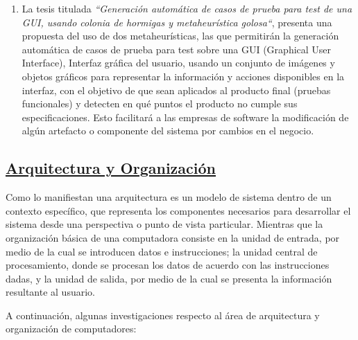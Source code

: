 \documentclass[10pt,conference]{IEEEtran}
\begin{document}
\begin{enumerate}
\item La tesis titulada \textit{“Generación automática de casos de prueba para test de una GUI, usando colonia de hormigas y metaheurística golosa“}, presenta una propuesta del uso de dos metaheurísticas, las que permitirán la generación automática de casos de prueba para test sobre una GUI (Graphical User Interface), Interfaz gráfica del usuario, usando un conjunto de imágenes y objetos gráficos para representar la información y acciones disponibles en la interfaz, con el objetivo de que sean aplicados al producto final (pruebas funcionales) y detecten en qué puntos el producto no cumple sus especificaciones. Esto facilitará a las empresas de software la modificación de algún artefacto o componente del sistema por cambios en el negocio.

\end{enumerate}

\subsection{\underline{\textbf{Arquitectura y Organización}}}
Como lo manifiestan \citep{bookar} una arquitectura es un modelo de sistema dentro de un contexto específico, que representa los componentes necesarios para desarrollar el sistema desde una perspectiva o punto de vista particular. Mientras que la organización básica de una computadora consiste en la unidad de entrada, por medio de la cual se introducen datos e instrucciones; la unidad central de procesamiento, donde se procesan los datos de acuerdo con las instrucciones dadas, y la unidad de salida, por medio de la cual se presenta la información resultante al usuario.

A continuación, algunas investigaciones respecto al área de arquitectura y organización de computadores:
\end{document}
